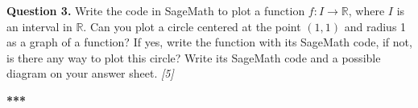 \documentclass[11pt,a4paper]{article}
\newcommand{\pts}[1]{\hfill \textit{[#1]}}
\begin{document}
\bigskip

\noindent \textbf{Question 3.} Write the code in SageMath to plot a function $f: I \rightarrow \mathbb{R}$, where $I$ is an interval in $\mathbb{R}$. Can you plot a circle centered at the point $(1, 1)$ and radius 1 as a graph of a function? If yes, write the function with its SageMath code, if not, is there any way to plot this circle? Write its SageMath code and a possible diagram on your answer sheet. \pts{5}

\bigskip
\begin{center}
  \textbf{***}
\end{center}
\end{document}
